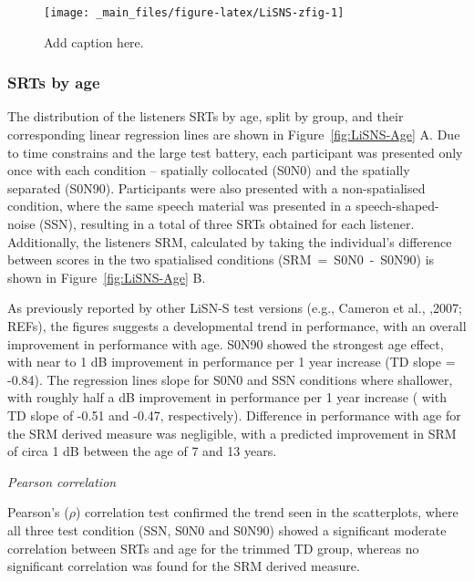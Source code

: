 \documentclass[a4paper, twoside]{templates/ociamthesis}
\begin{document}
\begin{figure}

{\centering \texttt{[image: \_main\_files/figure-latex/LiSNS-zfig-1]} 

}

\caption{Add caption here.}\label{fig:LiSNS-zfig}
\end{figure}

\hypertarget{srts-by-age}{%
\subsubsection*{SRTs by age}\label{srts-by-age}}

The distribution of the listeners SRTs by age, split by group, and their corresponding linear regression lines are shown in Figure~\ref{fig:LiSNS-Age} A. Due to time constrains and the large test battery, each participant was presented only once with each condition -- spatially collocated (S0N0) and the spatially separated (S0N90). Participants were also presented with a non-spatialised condition, where the same speech material was presented in a speech-shaped-noise (SSN), resulting in a total of three SRTs obtained for each listener. Additionally, the listeners SRM, calculated by taking the individual's difference between scores in the two spatialised conditions (SRM~=~S0N0~-~S0N90) is shown in Figure~\ref{fig:LiSNS-Age} B.

As previously reported by other LiSN-S test versions (e.g., Cameron et al., ,2007; REFs), the figures suggests a developmental trend in performance, with an overall improvement in performance with age. S0N90 showed the strongest age effect, with near to 1 dB improvement in performance per 1 year increase (TD slope = -0.84). The regression lines slope for S0N0 and SSN conditions where shallower, with roughly half a dB improvement in performance per 1 year increase ( with TD slope of -0.51 and -0.47, respectively). Difference in performance with age for the SRM derived measure was negligible, with a predicted improvement in SRM of circa 1 dB between the age of 7 and 13 years.

\colorbox[HTML]{CCCCFF}{\emph{Pearson correlation}}

Pearson's (\(\rho\)) correlation test confirmed the trend seen in the scatterplots, where all three test condition (SSN, S0N0 and S0N90) showed a significant moderate correlation between SRTs and age for the trimmed TD group, whereas no significant correlation was found for the SRM derived measure.
\end{document}
